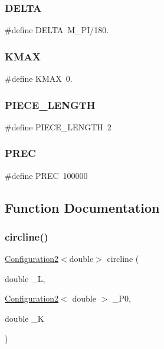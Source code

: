 \subsubsection{\texorpdfstring{DELTA}{DELTA}}
{\footnotesize\ttfamily \#define D\+E\+L\+TA~M\+\_\+\+PI/180.}

\mbox{\label{dubins_8hh_a940b85a83458e94519f2685b33ddd276}} 
\subsubsection{\texorpdfstring{KMAX}{KMAX}}
{\footnotesize\ttfamily \#define K\+M\+AX~0.}

\mbox{\label{dubins_8hh_a5b2500ca93a5100f73dc442d3cfea7d4}} 
\subsubsection{\texorpdfstring{PIECE\_LENGTH}{PIECE\_LENGTH}}
{\footnotesize\ttfamily \#define P\+I\+E\+C\+E\+\_\+\+L\+E\+N\+G\+TH~2}

\mbox{\label{dubins_8hh_a2bda1a81ce3474772a8a1f165e54516e}} 
\subsubsection{\texorpdfstring{PREC}{PREC}}
{\footnotesize\ttfamily \#define P\+R\+EC~100000}



\subsection{Function Documentation}
\mbox{\label{dubins_8hh_adef8b363044d7fed558e5b47d8d6a3a0}} 
\subsubsection{\texorpdfstring{circline()}{circline()}}
{\footnotesize\ttfamily \mbox{\hyperlink{class_configuration2}{Configuration2}}$<$double$>$ circline (\begin{DoxyParamCaption}\item[{double}]{\+\_\+L,  }\item[{\mbox{\hyperlink{class_configuration2}{Configuration2}}$<$ double $>$}]{\+\_\+\+P0,  }\item[{double}]{\+\_\+K }\end{DoxyParamCaption})}

